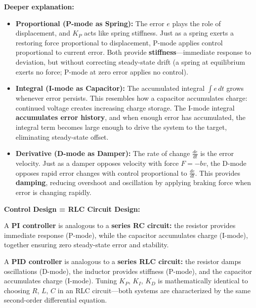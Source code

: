 \documentclass[
]{article}
\begin{document}
\textbf{Deeper explanation:}

\begin{itemize}
\item
  \textbf{Proportional (P-mode as Spring):} The error \(e\) plays the
  role of displacement, and \(K_P\) acts like spring stiffness. Just as
  a spring exerts a restoring force proportional to displacement, P-mode
  applies control proportional to current error. Both provide
  \textbf{stiffness}---immediate response to deviation, but without
  correcting steady-state drift (a spring at equilibrium exerts no
  force; P-mode at zero error applies no control).
\item
  \textbf{Integral (I-mode as Capacitor):} The accumulated integral
  \(\int e \, dt\) grows whenever error persists. This resembles how a
  capacitor accumulates charge: continued voltage creates increasing
  charge storage. The I-mode integral \textbf{accumulates error
  history}, and when enough error has accumulated, the integral term
  becomes large enough to drive the system to the target, eliminating
  steady-state offset.
\item
  \textbf{Derivative (D-mode as Damper):} The rate of change
  \(\frac{de}{dt}\) is the error velocity. Just as a damper opposes
  velocity with force \(F = -bv\), the D-mode opposes rapid error
  changes with control proportional to \(\frac{de}{dt}\). This provides
  \textbf{damping}, reducing overshoot and oscillation by applying
  braking force when error is changing rapidly.
\end{itemize}

\begin{tcolorbox}[enhanced jigsaw, left=2mm, bottomrule=.15mm, titlerule=0mm, rightrule=.15mm, leftrule=.75mm, colframe=quarto-callout-tip-color-frame, opacitybacktitle=0.6, colbacktitle=quarto-callout-tip-color!10!white, bottomtitle=1mm, breakable, coltitle=black, toptitle=1mm, arc=.35mm, colback=white, title=\textcolor{quarto-callout-tip-color}{\faLightbulb}\hspace{0.5em}{Tip}, opacityback=0, toprule=.15mm]

\textbf{Control Design = RLC Circuit Design:}

A \textbf{PI controller} is analogous to a \textbf{series RC circuit:}
the resistor provides immediate response (P-mode), while the capacitor
accumulates charge (I-mode), together ensuring zero steady-state error
and stability.

A \textbf{PID controller} is analogous to a \textbf{series RLC circuit:}
the resistor damps oscillations (D-mode), the inductor provides
stiffness (P-mode), and the capacitor accumulates charge (I-mode).
Tuning \(K_P\), \(K_I\), \(K_D\) is mathematically identical to choosing
\(R\), \(L\), \(C\) in an RLC circuit---both systems are characterized
by the same second-order differential equation.

\end{tcolorbox}
\end{document}
